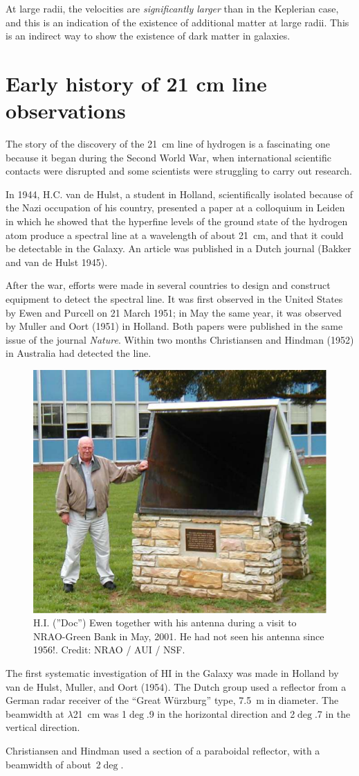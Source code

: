 At large radii, the velocities are {\it significantly larger} than in
the Keplerian case, and this is an indication of the existence of
additional matter at large radii. This is an indirect way to show the
existence of dark matter in galaxies.

\chapter{Early history of 21 cm line observations}\label{app-history}

The story of the discovery of the 21~cm line of hydrogen is a
fascinating one because it began during the Second World War, when
international scientific contacts were disrupted and some scientists
were struggling to carry out research.

In 1944, H.C. van de Hulst, a student in Holland, scientifically
isolated because of the Nazi occupation of his country, presented a
paper at a colloquium in Leiden in which he showed that the hyperfine
levels of the ground state of the hydrogen atom produce a spectral
line at a wavelength of about 21~cm, and that it could be detectable
in the Galaxy.  An article was published in a Dutch journal (Bakker
and van de Hulst 1945).

After the war, efforts were made in several countries to design and
construct equipment to detect the spectral line. It was first observed
in the United States by Ewen and Purcell on 21 March 1951; in May the
same year, it was observed by Muller and Oort (1951) in Holland. Both
papers were published in the same issue of the journal {\it Nature}.
Within two months Christiansen and Hindman (1952) in Australia had
detected the line.

\begin{figure}[h]
  \centering
  \includegraphics[width = 8 cm]{../figures/ev2.pdf}
  \caption{ H.I. (''Doc'') Ewen together with his antenna
	  during a visit to NRAO-Green Bank in May, 2001. He had not seen
	  his antenna since 1956!. Credit: NRAO / AUI / NSF. }
  \label{fig:evpu}
\end{figure}


The first systematic investigation of HI in the Galaxy was made in
Holland by van de Hulst, Muller, and Oort (1954).  The Dutch group
used a reflector from a German radar receiver of the ``Great
W\"urzburg'' type, 7.5~m in diameter.  The beamwidth at $\lambda$21~cm
was 1$\deg$.9 in the horizontal direction and 2$\deg$.7 in the
vertical direction.

Christiansen and Hindman used a section of a paraboidal reflector,
with a beamwidth of about~2$\deg$.
